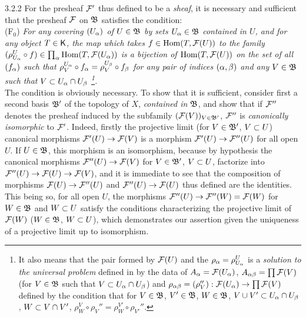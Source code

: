 \documentclass[../main.tex]{subfiles}
\begin{document}
\begin{env}{3.2.2}
For the presheaf $\mathcal{F}'$ thus defined to be a \emph{sheaf}, it is necessary and sufficient
that the presheaf $\mathcal{F}$ on $\mathfrak{B}$ satisfies the condition:\\

  (F$_0$) \emph{For any covering $(U_\alpha)$ of $U\in\mathfrak{B}$ by sets $U_\alpha\in\mathfrak{B}$
  contained in $U$, and for any object $T\in\mathsf{K}$, the map which takes $f\in\operatorname{Hom}(T,\mathcal{F}(U))$
  to the family $(\rho_{U_\alpha}^U\circ f)\in\prod_\alpha\operatorname{Hom}(T,\mathcal{F}(U_\alpha))$ is a bijection of
  $\operatorname{Hom}(T,\mathcal{F}(U))$ on the set of all $(f_\alpha)$ such that $\rho_V^{U_\alpha}\circ f_\alpha=\rho_V^{U_\beta}\circ f_\beta$
  for any pair of indices $(\alpha,\beta)$ and any $V\in\mathfrak{B}$ such that $V\subset U_\alpha\cap U_\beta$
  \footnote{It also means that the pair formed by $\mathcal{F}(U)$ and the $\rho_\alpha=\rho_{U_\alpha}^U$
  is a \emph{solution to the universal problem} defined in  by the data of $A_\alpha=\mathcal{F}(U_\alpha)$,
  $A_{\alpha\beta}=\prod\mathcal{F}(V)$ (for $V\in\mathfrak{B}$ such that $V\subset U_\alpha\cap U_\beta$) and
  $\rho_{\alpha\beta}=(\rho_V''):\mathcal{F}(U_\alpha)\to\prod\mathcal{F}(V)$ defined by the condition that for
  $V\in\mathfrak{B}$, $V'\in\mathfrak{B}$, $W\in\mathfrak{B}$, $V\cup V'\subset U_\alpha\cap U_\beta$,
  $W\subset V\cap V'$, $\rho_W^V\circ\rho_V''=\rho_W^{V'}\circ\rho_{V'}''$.}.}\\

The condition is obviously necessary. To show that it is sufficient,
consider first a second basis $\mathfrak{B}'$ of the topology of $X$, \emph{contained in} $\mathfrak{B}$, and
show that if $\mathcal{F}''$ denotes the presheaf induced by the subfamily $(\mathcal{F}(V))_{V\in\mathfrak{B}'}$, $\mathcal{F}''$ is
\emph{canonically isomorphic} to $\mathcal{F}'$. Indeed, firstly the projective limit (for $V\in\mathfrak{B}'$,
$V\subset U$) canonical morphisms ${\mathcal{F}'(U)\to\mathcal{F}(V)}$ is a morphism ${\mathcal{F}'(U)\to\mathcal{F}''(U)}$
for all open $U$. If $U\in\mathfrak{B}$, this morphism is an isomorphism, because by hypothesis
the canonical morphisms ${\mathcal{F}''(U)\to\mathcal{F}(V)}$ for $V\in\mathfrak{B}'$, $V\subset U$, factorize into
${\mathcal{F}''(U)\to\mathcal{F}(U)\to\mathcal{F}(V)}$, and it is immediate to see that the composition of morphisms
${\mathcal{F}(U)\to\mathcal{F}''(U)}$ and ${\mathcal{F}''(U)\to\mathcal{F}(U)}$ thus defined are the identities. This being so, for
all open $U$, the morphisms ${\mathcal{F}''(U)\to\mathcal{F}''(W)=\mathcal{F}(W)}$ for $W\in\mathfrak{B}$ and $W\subset U$ satisfy
the conditions characterizing the projective limit of $\mathcal{F}(W)$ ($W\in\mathfrak{B}$, $W\subset U$), which demonstrates
our assertion given the uniqueness of a projective limit up to isomorphism.


\end{env}
\end{document}
